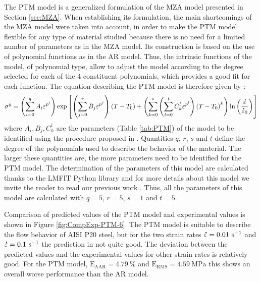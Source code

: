 \documentclass[twoside,english,1p,final,sort&compress]{elsarticle}
\theoremstyle{plain}
\newcommand{\mdot}[1]{\accentset{\mbox{\bfseries .}}{#1}}
\newcommand{\RMSE}{\text{E}_\text{RMS}}
\newcommand{\AARE}{\text{E}_\text{AAR}}
\newcommand{\ps}{\text{s}^{-1}}
\begin{document}
The PTM model \cite{TizeMha-2022} is a generalized formulation of the MZA model presented in Section \ref{sec:MZA}.
When establishing its formulation, the main shortcomings of the MZA model were taken into account, in order to make the PTM model flexible for any type of material studied because there is no need for a limited number of parameters as in the MZA model.
Its construction is based on the use of polynomial functions as in the AR model.
Thus, the intrinsic functions of the model, of polynomial type, allow to adjust the model according to the degree selected for each of the 4 constituent polynomials, which provides a good fit for each function.
The equation describing the PTM model is therefore given by :
\begin{equation}
\label{eq:PTM-model}
\sigma^y = \left(\sum_{i=0}^{q}{A_i\varepsilon^{p^i}}\right) \exp\left[\left(\sum_{j=0}^{r}{B_j\varepsilon^{p^j}}\right)\left(T-T_0\right) + \left(\sum_{k=0}^{s}\left(\sum_{l=0}^{t}{C_k^l\varepsilon^{p^l}} \right)\left(T-T_0\right)^k \right)\ln\left( \frac{\mdot\varepsilon}{\mdot{\varepsilon}_0}\right)\right]
\end{equation}
where $A_i, B_j, C_k^l$ are the parameters (Table \ref{tab:PTM}) of the model to be identified using the procedure proposed in  \cite{TizeMha-2022}.
Quantities $q$, $r$, $s$ and $t$ define the degree of the polynomials used to describe the behavior of the material.
The larger these quantities are, the more parameters need to be identified for the PTM model.
The determination of the parameters of this model are calculated thanks to the LMFIT Python library \cite{Newville-2016} and for more details about this model  we invite the reader to read our previous work \cite{TizeMha-2022}.
Thus, all the parameters of this model are calculated with $q=5$, $r=5$, $s=1$ and $t=5$.

Comparison of predicted values of the PTM model and experimental values is shown in Figure \ref{fig:CompExp-PTM-6}.
The PTM model is suitable to describe the ﬂow behavior of AISI P20 steel, but for the two strain rates $\mdot\varepsilon=0.01~\ps$ and $\mdot\varepsilon=0.1~\ps$ the prediction in not quite good.
The deviation between the predicted values and the experimental values for other strain rates is relatively good.
For the PTM model, $\AARE=4.79~\%$ and $\RMSE=4.59~\text{MPa}$ this shows an overall worse performance than the AR model.
\end{document}
